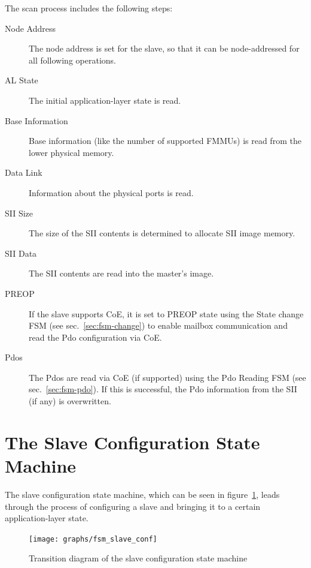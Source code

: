 \documentclass[a4paper,12pt,BCOR6mm,bibtotoc,idxtotoc]{scrbook}
\begin{document}
The scan process includes the following steps:

\begin{description}

\item[Node Address] The node address is set for the slave, so that it can be
node-addressed for all following operations.

\item[AL State] The initial application-layer state is read.

\item[Base Information] Base information (like the number of supported FMMUs)
is read from the lower physical memory.

\item[Data Link] Information about the physical ports is read.

\item[SII Size] The size of the SII contents is determined to allocate SII
image memory.

\item[SII Data] The SII contents are read into the master's image.

\item[PREOP] If the slave supports CoE, it is set to PREOP state using the
State change FSM (see sec.~\ref{sec:fsm-change}) to enable mailbox
communication and read the Pdo configuration via CoE.

\item[Pdos] The Pdos are read via CoE (if supported) using the Pdo Reading FSM
(see sec.~\ref{sec:fsm-pdo}). If this is successful, the Pdo information from
the SII (if any) is overwritten.

\end{description}


\section{The Slave Configuration State Machine}
\label{sec:fsm-conf}

The slave configuration state machine, which can be seen in
figure~\ref{fig:fsm-slaveconf}, leads through the process of configuring a
slave and bringing it to a certain application-layer state.

\begin{figure}[htbp]
  \centering
  \texttt{[image: graphs/fsm\_slave\_conf]}
  \caption{Transition diagram of the slave configuration state
    machine}
  \label{fig:fsm-slaveconf}
\end{figure}
\end{document}
